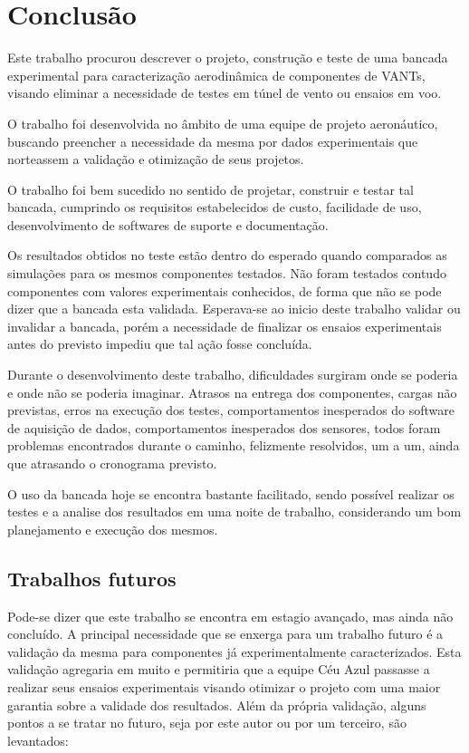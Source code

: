\chapter{Conclusão}\label{chp:conc}

    Este trabalho procurou descrever o projeto, construção e teste de uma bancada experimental para caracterização aerodinâmica de componentes de VANTs, visando eliminar a necessidade de testes em túnel de vento ou ensaios em voo.
    
    O trabalho foi desenvolvida no âmbito de uma equipe de projeto aeronáutico, buscando preencher a necessidade da mesma por dados experimentais que norteassem a validação e otimização de seus projetos.
    
    O trabalho foi bem sucedido no sentido de projetar, construir e testar tal bancada, cumprindo os requisitos estabelecidos de custo, facilidade de uso, desenvolvimento de softwares de suporte e documentação. 
    
    Os resultados obtidos no teste estão dentro do esperado quando comparados as simulações para os mesmos componentes testados.  Não foram testados contudo componentes com valores experimentais conhecidos, de forma que não se pode dizer que a bancada esta validada. Esperava-se ao inicio deste trabalho validar ou invalidar a bancada, porém a necessidade de finalizar os ensaios experimentais antes do previsto impediu que tal ação fosse concluída.
    
    Durante o desenvolvimento deste trabalho, dificuldades surgiram onde se poderia e onde não se poderia imaginar. Atrasos na entrega dos componentes, cargas não previstas, erros na execução dos testes, comportamentos inesperados do software de aquisição de dados, comportamentos inesperados dos sensores, todos foram problemas encontrados durante o caminho, felizmente resolvidos, um a um, ainda que atrasando o cronograma previsto.
    
    O uso da bancada hoje se encontra bastante facilitado, sendo possível realizar os testes e a analise dos resultados em uma noite de trabalho, considerando um bom planejamento e execução dos mesmos.
    
\section{Trabalhos futuros}
    
    Pode-se dizer que este trabalho se encontra em estagio avançado, mas ainda não concluído. A principal necessidade que se enxerga para um trabalho futuro é a validação da mesma para componentes já experimentalmente caracterizados. Esta validação agregaria em muito e permitiria que a equipe Céu Azul passasse a realizar seus ensaios experimentais visando otimizar o projeto com uma maior garantia sobre a validade dos resultados. Além da própria validação, alguns pontos a se tratar no futuro, seja por este autor ou por um terceiro, são levantados:
    
